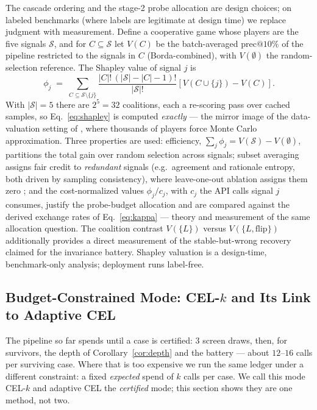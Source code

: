 \documentclass[11pt]{article}
\makeatletter
\newcommand{\sigsetX}{\mathcal{S}}
\newcommand{\precat}[1]{\mathrm{prec}@#1}
\makeatother
\begin{document}
The cascade ordering and the stage-2 probe allocation are design
choices; on labeled benchmarks (where labels are legitimate at design
time) we replace judgment with measurement. Define a cooperative game
whose players are the five signals $\sigsetX$, and for $C \subseteq
\sigsetX$ let $V(C)$ be the batch-averaged $\precat{10\%}$ of the
pipeline restricted to the signals in $C$ (Borda-combined), with
$V(\emptyset)$ the random-selection reference. The Shapley value of
signal $j$ is
\begin{equation}
  \phi_j \;=\; \sum_{C \subseteq \sigsetX \setminus \{j\}}
  \frac{|C|!\,\left(|\sigsetX| - |C| - 1\right)!}{|\sigsetX|!}
  \left[ V(C \cup \{j\}) - V(C) \right].
  \label{eq:shapley}
\end{equation}
With $|\sigsetX| = 5$ there are $2^5 = 32$ coalitions, each a
re-scoring pass over cached samples, so Eq.~\eqref{eq:shapley} is
computed \emph{exactly} --- the mirror image of the data-valuation
setting of \citet{ghorbani2019}, where thousands of players force
Monte Carlo approximation. Three properties are used: efficiency,
$\sum_j \phi_j = V(\sigsetX) - V(\emptyset)$, partitions the total
gain over random selection across signals; subset averaging assigns
fair credit to \emph{redundant} signals (e.g.\ agreement and rationale
entropy, both driven by sampling consistency), where leave-one-out
ablation assigns them zero \citep{ghorbani2019}; and the
cost-normalized values $\phi_j / c_j$, with $c_j$ the API calls signal
$j$ consumes, justify the probe-budget allocation and are compared
against the derived exchange rates of Eq.~\eqref{eq:kappa} --- theory
and measurement of the same allocation question. The coalition
contrast $V(\{L\})$ versus $V(\{L, \mathrm{flip}\})$ additionally
provides a direct measurement of the stable-but-wrong recovery claimed
for the invariance battery. Shapley valuation is a design-time,
benchmark-only analysis; deployment runs label-free.

\subsection{Budget-Constrained Mode: CEL-$k$ and Its Link to Adaptive CEL}
\label{sec:method:budget}

The pipeline so far spends until a case is certified: $3$ screen draws,
then, for survivors, the depth of Corollary~\ref{cor:depth} and the
battery --- about $12$--$16$ calls per surviving case. Where that is too
expensive we run the same ledger under a different constraint: a fixed
\emph{expected} spend of $k$ calls per case. We call this mode
CEL-$k$ and adaptive CEL the \emph{certified} mode; this section shows
they are one method, not two.
\end{document}

